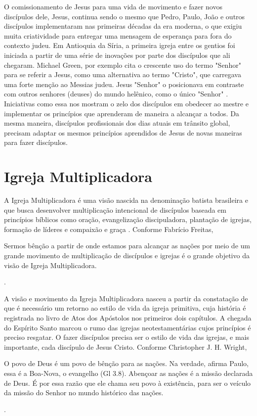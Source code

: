 \documentclass[
	12pt,				%
	openright,			%
	twoside,			%
	a4paper,			%
	english,			%
	french,				%
	spanish,			%
	brazil				%
	]{abntex2}
\begin{document}
O comissionamento de Jesus para uma vida de movimento e fazer novos discípulos dele, Jesus, continua sendo o mesmo que Pedro, Paulo, João e outros discípulos implementaram nas primeiras décadas da era moderna, o que exigiu muita criatividade para entregar uma mensagem de esperança para fora do contexto judeu. Em Antioquia da Síria, a primeira igreja entre os gentios foi iniciada a partir de uma série de inovações por parte dos discípulos que ali chegaram. Michael Green, por exemplo cita o crescente uso do termo "Senhor" para se referir a Jesus, como uma alternativa ao termo "Cristo", que carregava uma forte menção ao Messias judeu. Jesus "Senhor" o posicionava em contraste com outros senhores (deuses) do mundo helênico, como o único "Senhor" \cite[170]{green}. Iniciativas como essa nos mostram o zelo dos discípulos em obedecer ao mestre e implementar os princípios que aprenderam de maneira a alcançar a todos. Da mesma maneira, discípulos profissionais dos dias atuais em trânsito global, precisam adaptar os mesmos princípios aprendidos de Jesus de novas maneiras para fazer discípulos.


\section{Igreja Multiplicadora}

A Igreja Multiplicadora é uma visão nascida na denominação batista brasileira e que busca desenvolver multiplicação intencional de discípulos baseada em princípios bíblicos como oração, evangelização discipuladora, plantação de igrejas, formação de líderes e compaixão e graça \cite{igrejaMultiplicVisaoSite}. Conforme Fabrício Freitas, \begin{citacao}Sermos bênção a partir de onde estamos para alcançar as nações por meio de um grande movimento de multiplicação de discípulos e igrejas é o grande objetivo da visão de Igreja Multiplicadora.\end{citacao}\cite[19]{freitas}.

A visão e movimento da Igreja Multiplicadora nasceu a partir da constatação de que é necessário um retorno ao estilo de vida da igreja primitiva, cuja história é registrada no livro de Atos dos Apóstolos nos primeiros dois capítulos. A chegada do Espírito Santo marcou o rumo das igrejas neotestamentárias cujos princípios é preciso resgatar. O fazer discípulos precisa ser o estilo de vida das igrejas, e mais importante, cada discípulo de Jesus Cristo. Conforme Christopher J. H. Wright, 
\begin{citacao}O povo de Deus é um povo de bênção para as nações. Na verdade, afirma Paulo, essa é a Boa-Nova, o evangelho (Gl 3.8). Abençoar as nações é a missão declarada de Deus. É por essa razão que ele chama seu povo à existência, para ser o veículo da missão do Senhor no mundo histórico das nações.\end{citacao}\cite[98]{wright_missao_2012}.
\end{document}
